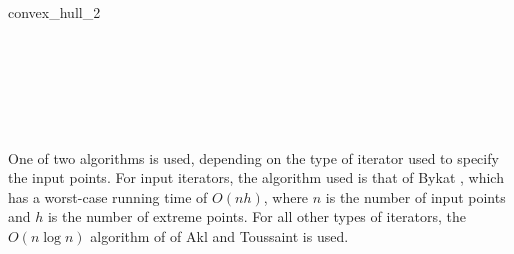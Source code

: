 \begin{ccRefFunction}{convex_hull_2}
\ccSeeAlso

 \\
 \\
 \\
 \\
 \\

\ccImplementation

One of two algorithms is used,
depending on the type of iterator used to specify the input points.  For
input iterators, the algorithm used is that of Bykat \cite{b-chfsp-78}, which 
has a worst-case running time of $O(n h)$, where $n$ is the number of input 
points and $h$ is the number of extreme points.  For all other types of 
iterators, the $O(n \log n)$ algorithm of of Akl and Toussaint 
\cite{at-fcha-78} is used.



\end{ccRefFunction}


